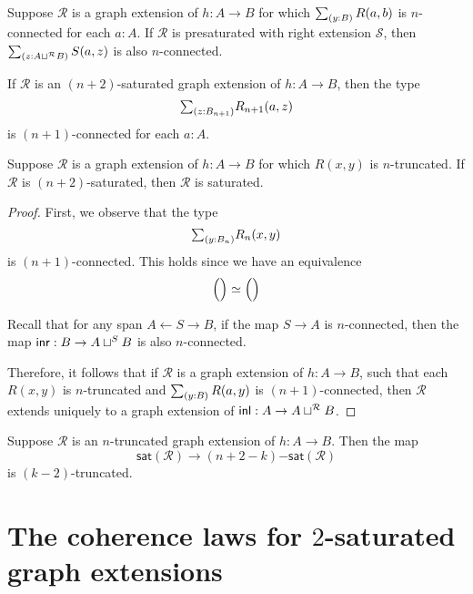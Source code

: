 \begin{lem}
Suppose $\mathcal{R}$ is a graph extension of $h:A\to B$ for which $\sm{y:B}R(a,b)$ is $n$-connected for each $a:A$. If $\mathcal{R}$ is presaturated with right extension $\mathcal{S}$, then $\sm{z:A\sqcup^{\mathcal{R}} B}S(a,z)$ is also $n$-connected.
\end{lem}

\begin{lem}
If $\mathcal{R}$ is an $(n+2)$-saturated graph extension of $h:A\to B$, then the type
\begin{equation*}
\sm{z:B_{n+1}}R_{n+1}(a,z)
\end{equation*}
is $(n+1)$-connected for each $a:A$.
\end{lem}

\begin{thm}
Suppose $\mathcal{R}$ is a graph extension of $h:A\to B$ for which $R(x,y)$ is $n$-truncated. If $\mathcal{R}$ is $(n+2)$-saturated, then $\mathcal{R}$ is saturated.
\end{thm}

\begin{proof}
First, we observe that the type
\begin{equation*}
\sm{y:B_n}R_{n}(x,y)
\end{equation*}
is $(n+1)$-connected. This holds since we have an equivalence
\begin{equation*}
\eqv{\Big(\Big)}{\Big(\Big)}
\end{equation*}

Recall that for any span $A \leftarrow S \rightarrow B$, if the map $S\to A$ is $n$-connected, then the map ${\mathsf{inr}}:B\to A\sqcup^S B$ is also $n$-connected.

Therefore, it follows that if $\mathcal{R}$ is a graph extension of $h:A\to B$, such that each $R(x,y)$ is $n$-truncated and $\sm{y:B}R(a,y)$ is $(n+1)$-connected, then $\mathcal{R}$ extends uniquely to a graph extension of ${\mathsf{inl}}:A\to A\sqcup^{\mathcal{R}} B$.
\end{proof}

\begin{conj}
Suppose $\mathcal{R}$ is an $n$-truncated graph extension of $h:A\to B$. Then the map
\begin{equation*}
\mathsf{sat}(\mathcal{R})\to (n+2-k)\mathsf{{-}sat}(\mathcal{R})
\end{equation*}
is $(k-2)$-truncated.
\end{conj}

\section{The coherence laws for $2$-saturated graph extensions}

